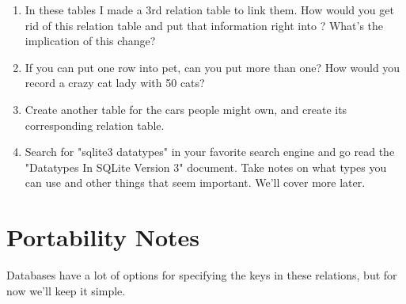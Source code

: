 \begin{enumerate}
\item In these tables I made a 3rd relation table to link them.  How would you
    get rid of this relation table  and put that
    information right into ?  What's the implication of this
    change?
\item If you can put one row into  pet, can you put more than
    one?  How would you record a crazy cat lady with 50 cats?
\item Create another table for the cars people might own, and create its
    corresponding relation table.
\item Search for "sqlite3 datatypes" in your favorite search engine and 
    go read the "Datatypes In SQLite Version 3" document.  Take notes on
    what types you can use and other things that seem important.  We'll
    cover more later.
\end{enumerate}

\section{Portability Notes}

Databases have a lot of options for specifying the keys in these relations,
but for now we'll keep it simple.

